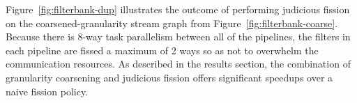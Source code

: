 Figure~\ref{fig:filterbank-dup} illustrates the outcome of performing
judicious fission on the coarsened-granularity stream graph from
Figure~\ref{fig:filterbank-coarse}.  Because there is 8-way task
parallelism between all of the pipelines, the filters in each pipeline
are fissed a maximum of 2 ways so as not to overwhelm the
communication resources.  As described in the results section, the
combination of granularity coarsening and judicious fission offers
significant speedups over a naive fission policy.

